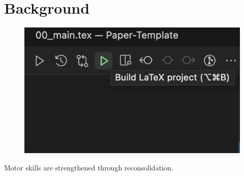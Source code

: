 \documentclass[00_main.tex]{subfiles}
\begin{document}
\setcounter{section}{1}
\section{Background}

\begin{figure}[ht]
    \begin{center}
        \includegraphics{img/01.png}
        \label{img:test}
    \end{center}
\end{figure}

\blindtext

Motor skills are strengthened through reconsolidation. \cite{Wymbs2016}
\end{document}
